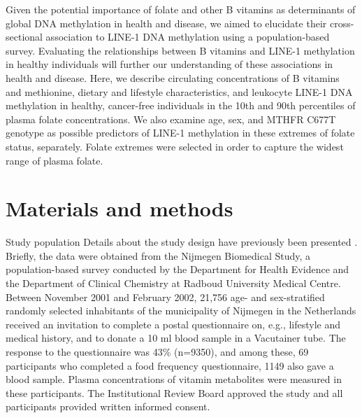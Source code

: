 Given the potential importance of folate and other B vitamins as determinants of global DNA methylation in health and disease, we aimed to elucidate their cross-sectional association to LINE-1 DNA methylation using a population-based survey. Evaluating the relationships between B vitamins and LINE-1 methylation in healthy individuals will further our understanding of these associations in health and disease. Here, we describe circulating concentrations of B vitamins and methionine, dietary and lifestyle characteristics, and leukocyte LINE-1 DNA methylation in healthy, cancer-free individuals in the 10th and 90th percentiles of plasma folate concentrations. We also examine age, sex, and MTHFR C677T genotype as possible predictors of LINE-1 methylation in these extremes of folate status, separately. Folate extremes were selected in order to capture the widest range of plasma folate. 

\section{Materials and methods} %
Study population
Details about the study design have previously been presented \cite{c321}. Briefly, the data were obtained from the Nijmegen Biomedical Study, a population-based survey conducted by the Department for Health Evidence and the Department of Clinical Chemistry at Radboud University Medical Centre. Between November 2001 and February 2002, 21,756 age- and sex-stratified randomly selected inhabitants of the municipality of Nijmegen in the Netherlands received an invitation to complete a postal questionnaire on, e.g., lifestyle and medical history, and to donate a 10 ml blood sample in a Vacutainer tube. The response to the questionnaire was 43\% (n=9350), and among these, 69%
participants who completed a food frequency questionnaire, 1149 also gave a blood sample. Plasma concentrations of vitamin metabolites were measured in these participants. The Institutional Review Board approved the study and all participants provided written informed consent. 
 

